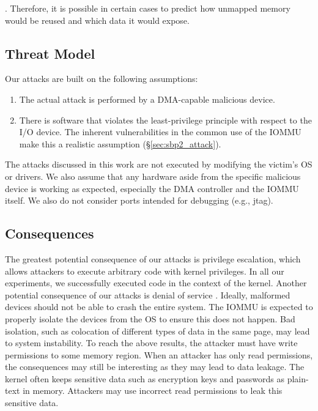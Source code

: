 . Therefore, it is possible in certain cases to predict how unmapped memory would be reused and which data it would expose.  
\subsection{Threat Model}
Our attacks are built on the following assumptions:
\begin{enumerate}
    \item The actual attack is performed by a DMA-capable malicious device.
    \item There is software that violates the least-privilege principle with respect to the I/O device. The inherent vulnerabilities in the common use of the IOMMU make this a realistic assumption (§\ref{sec:sbp2_attack}). 
 \end{enumerate}
 The attacks discussed in this work are not executed by modifying the victim’s OS or drivers. We also assume that any hardware aside from the specific malicious device is working as expected, especially the DMA controller and the IOMMU itself. We also do not consider ports intended for debugging (e.g., jtag).
\subsection{Consequences}
The greatest potential consequence of our attacks is privilege escalation, which allows attackers to execute arbitrary code with kernel privileges. In all our experiments, we successfully executed code in the context of the kernel. Another potential consequence of our attacks is denial of service \cite{MMT16}. Ideally, malformed devices should not be able to crash the entire system. The IOMMU is expected to properly isolate the devices from the OS to ensure this does not happen. Bad isolation, such as colocation of different types of data in the same page, may lead to system instability. To reach the above results, the attacker must have write permissions to some memory region. When an attacker has only read permissions, the consequences may still be interesting as they may lead to data leakage\cite{thunder}. The kernel often keeps sensitive data such as encryption keys and passwords as plain-text in memory. Attackers may use incorrect read permissions to leak this sensitive data.